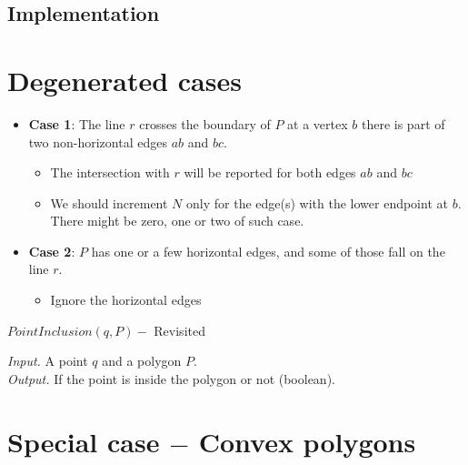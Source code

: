 \documentclass[twoside,12pt, a4paper]{memoir}
\begin{document}
\subsection{Implementation}\label{subsec:label}


\section{Degenerated cases}\label{subsec:point-degenerated}

\begin{itemize}
  \item \textbf{Case 1}: The line $r$ crosses the boundary of $P$ at a vertex $b$ there is part of two non-horizontal edges $ab$ and $bc$.
        \begin{itemize}
          \item The intersection with $r$ will be reported for both edges $ab$ and $bc$
          \item We should increment $N$ only for the edge(s) with the lower endpoint at $b$. There might be zero,  one or two of such case.
        \end{itemize}

  \item \textbf{Case 2}: $P$ has one or a few horizontal edges, and some of those fall on the line $r$.
        \begin{itemize}
          \item Ignore the horizontal edges
        \end{itemize}
\end{itemize}

\begin{algorithm}
\caption{$PointInclusion(q, P) - $ Revisited}
\textit{Input.} A point $q$ and a polygon $P$. \\
\textit{Output.} If the point is inside the polygon or not (boolean).
\begin{algorithmic}[1]
      \EndIf{}
    \EndFor{}

    \Else{}
    \EndIf{}
\end{algorithmic}\label{inclusion}
\end{algorithm}

\section{Special case $-$ Convex polygons}\label{subsec:point-convex}
\end{document}
